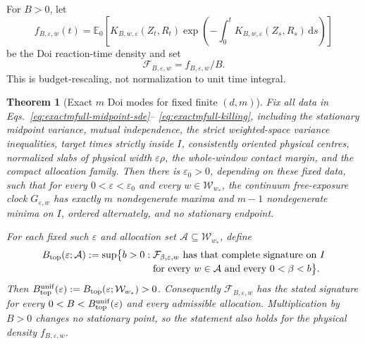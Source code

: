 \documentclass[aps,physrev,onecolumn,amsmath,amssymb,longbibliography]{revtex4-2}
\newcommand{\dd}{\mathrm d}
\newtheorem{theorem}{Theorem}[section]
\begin{document}
For \(B>0\), let
\begin{equation}
 f_{B,\varepsilon,w}(t)
 =\mathbb E_0\!\left[
 K_{B,w,\varepsilon}(Z_t,R_t)
 \exp\!\left(-\int_0^tK_{B,w,\varepsilon}(Z_s,R_s)\,\dd s\right)
 \right]
 \label{eq:exactmfull-reaction-density}
\end{equation}
be the Doi reaction-time density and set
\begin{equation}
 \mathcal F_{B,\varepsilon,w}=f_{B,\varepsilon,w}/B.
 \label{eq:exactmfull-rescaled-density}
\end{equation}
This is budget-rescaling, not normalization to unit time integral.

\begin{theorem}[Exact \(m\) Doi modes for fixed finite \((d,m)\)]
\label{thm:exactmfull-doi}
Fix all data in Eqs.~\eqref{eq:exactmfull-midpoint-sde}--%
\eqref{eq:exactmfull-killing}, including the stationary midpoint variance,
mutual independence, the strict weighted-space variance inequalities, target
times strictly inside \(I\), consistently oriented physical centres,
normalized slabs of physical width \(\varepsilon\rho\), the whole-window
contact margin, and the compact allocation family.  Then there is
\(\varepsilon_0>0\), depending on these fixed data, such that for every
\(0<\varepsilon<\varepsilon_0\) and every
\(w\in\mathcal W_{w_*}\), the continuum free-exposure clock
\(G_{\varepsilon,w}\) has exactly \(m\) nondegenerate maxima and \(m-1\)
nondegenerate minima on \(I\), ordered alternately, and no stationary
endpoint.

For each fixed such \(\varepsilon\) and allocation set
\(\mathcal A\subseteq\mathcal W_{w_*}\), define
\begin{align}
 B_{\rm top}(\varepsilon;\mathcal A)
 :=\sup\bigl\{b>0:\;&
 \mathcal F_{\beta,\varepsilon,w}
 \text{ has that complete signature on }I
 \nonumber\\[-2pt]
 &\text{for every }w\in\mathcal A
 \text{ and every }0<\beta<b\bigr\}.
 \label{eq:exactmfull-btop}
\end{align}
Then
\(B_{\rm top}^{\rm unif}(\varepsilon):=
B_{\rm top}(\varepsilon;\mathcal W_{w_*})>0\).
Consequently \(\mathcal F_{B,\varepsilon,w}\) has the stated signature for
every \(0<B<B_{\rm top}^{\rm unif}(\varepsilon)\) and every admissible
allocation.  Multiplication by \(B>0\) changes no stationary point, so the
statement also holds for the physical density \(f_{B,\varepsilon,w}\).
\end{theorem}
\end{document}
